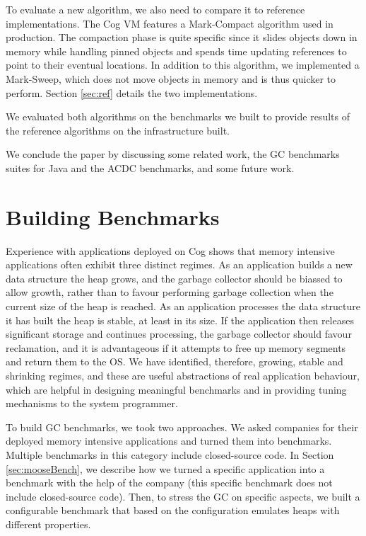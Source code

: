 \documentclass[10pt, sigplan]{acmart}
\begin{document}
To evaluate a new algorithm, we also need to compare it to reference implementations. The Cog VM features a Mark-Compact algorithm used in production. The compaction phase is quite specific since it slides objects down in memory while handling pinned objects and spends time updating references to point to their eventual locations. In addition to this algorithm, we implemented a Mark-Sweep, which does not move objects in memory and is thus quicker to perform. Section \ref{sec:ref} details the two implementations.

We evaluated both algorithms on the benchmarks we built to provide results of the reference algorithms on the infrastructure built.

We conclude the paper by discussing some related work, the GC benchmarks suites for Java and the ACDC benchmarks, and some future work.

\section{Building Benchmarks} \label{sec:bench}
Experience with applications deployed on Cog shows that memory intensive applications often exhibit three distinct regimes.  As an application builds a new data structure the heap grows, and the garbage collector should be biassed to allow growth, rather than to favour performing garbage collection when the current size of the heap is reached.  As an application processes the data structure it has built the heap is stable, at least in its size.  If the application then releases significant storage and continues processing, the garbage collector should favour reclamation, and it is advantageous if it attempts to free up memory segments and return them to the OS.  We have identified, therefore, growing, stable and shrinking regimes, and these are useful abstractions of real application behaviour, which are helpful in designing meaningful benchmarks and in providing tuning mechanisms to the system programmer.

To build GC benchmarks, we took two approaches. We asked companies for their deployed memory intensive applications and turned them into benchmarks. Multiple benchmarks in this category include closed-source code. In Section \ref{sec:mooseBench}, we describe how we turned a specific application into a benchmark with the help of the company (this specific benchmark does not include closed-source code). Then, to stress the GC on specific aspects, we built a configurable benchmark that based on the configuration emulates heaps with different properties. 
\end{document}
